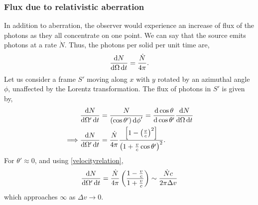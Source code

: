\documentclass{book}
\begin{document}
\subsubsection{Flux due to relativistic aberration}
In addition to aberration, the observer would experience an increase of flux of the photons as they all concentrate on one point. We can say that the source emits photons at a rate $\Dot{N}$. Thus, the photons per solid per unit time are,
\begin{equation}
	\dv{N}{\Omega\dd{t}} = \frac{\Dot{N}}{4\pi}.
\end{equation}
Let us consider a frame $S'$ moving along $x$ with $y$ rotated by an azimuthal angle $\phi$, unaffected by the Lorentz transformation. The flux of photons in $S'$ is given by,
\begin{equation}
	\begin{split}
		& \dv{N}{\Omega'\dd{t}} = \frac{N}{\left(\cos\theta'\right)\dd{\phi}'} = \dv{\cos\theta}{\cos\theta'}\dv{N}{\Omega\dd{t}} \\
		\implies & \dv{N}{\Omega'\dd{t}} = \frac{\Dot{N}}{4\pi}\frac{\left[1 - \left(\frac{v}{c}\right)^2\right]}{\left(1 + \frac{v}{c}\cos\theta'\right)^2}.
	\end{split}
\end{equation}
For $\theta' \approx 0$, and using \eqref{velocityrelation},
\begin{equation}
	\dv{N}{\Omega'\dd{t}} = \frac{\Dot{N}}{4\pi}\left(\frac{1- \frac{v}{c}}{1 + \frac{v}{c}}\right) \sim \frac{\Dot{N}c}{2\pi\Delta v}
\end{equation}
which approaches $\infty$ as $\Delta v \to 0$.
\end{document}
